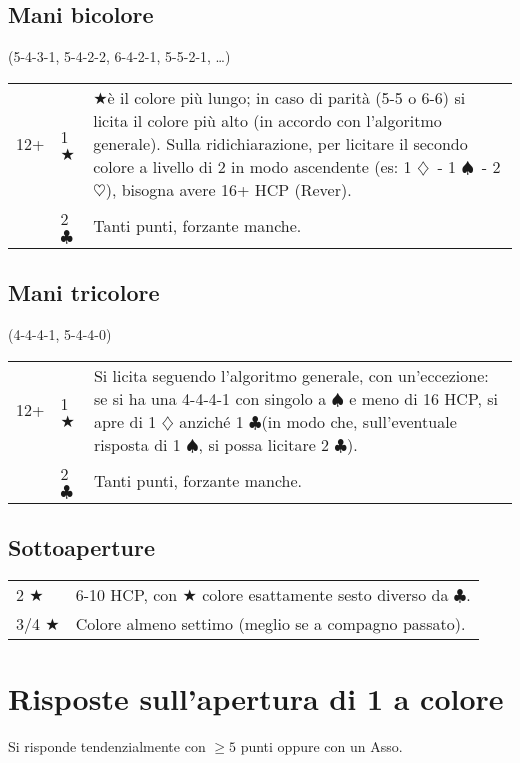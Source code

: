\documentclass[a4paper,10pt]{article}
\renewcommand{\c}{$\clubsuit$\xspace}
\renewcommand{\d}{$\diamondsuit$\xspace}
\newcommand{\h}{$\heartsuit$\xspace}
\newcommand{\s}{$\spadesuit$\xspace}
\renewcommand{\j}{$\bigstar$\xspace}
\newcommand{\smallspace}{\vskip0.3cm}
\newenvironment{twocol}
  {\smallspace\noindent\begin{tabular}{l p{0.78\textwidth}}}
  {\end{tabular}\smallspace}
\newenvironment{threecol}
  {\smallspace\noindent\begin{tabular}{l l p{0.78\textwidth}}}
  {\end{tabular}\smallspace}
\begin{document}
\subsection{Mani bicolore}
(5-4-3-1, 5-4-2-2, 6-4-2-1, 5-5-2-1, \dots)

\begin{threecol}
 12+ & 1 \j & \j \`e il colore pi\`u lungo; in caso di parit\`a (5-5 o 6-6) si licita il colore pi\`u alto (in accordo con l'algoritmo generale). Sulla ridichiarazione, per licitare il secondo colore a livello di 2 in modo ascendente (es: 1 \d\ - 1 \s\ - 2 \h), bisogna avere 16+ HCP (Rever).\\
 & 2 \c & Tanti punti, forzante manche.
\end{threecol}


\subsection{Mani tricolore}
(4-4-4-1, 5-4-4-0)

\begin{threecol}
 12+ & 1 \j & Si licita seguendo l'algoritmo generale, con un'eccezione: se si ha una 4-4-4-1 con singolo a \s e meno di 16 HCP, si apre di 1 \d anzich\'e 1 \c (in modo che, sull'eventuale risposta di 1 \s, si possa licitare 2 \c).\\
 & 2 \c & Tanti punti, forzante manche.
\end{threecol}


\subsection{Sottoaperture}

\begin{twocol}
 2 \j & 6-10 HCP, con \j colore esattamente sesto diverso da \c.\\
 3/4 \j & Colore almeno settimo (meglio se a compagno passato).\\
\end{twocol}



\pagebreak

\section{Risposte sull'apertura di 1 a colore}

Si risponde tendenzialmente con $\geq 5$ punti oppure con un Asso.
\end{document}

